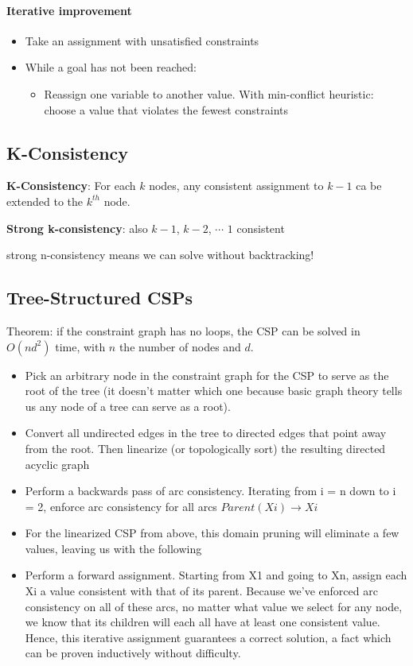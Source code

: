 \paragraph{Iterative improvement} 
\begin{itemize}
    \item Take an assignment with unsatisfied constraints
    \item While a goal has not been reached:
    \begin{itemize}
        \item Reassign one variable to another value. With  min-conflict heuristic: choose a value that violates the fewest constraints
    \end{itemize}
\end{itemize}

\subsection{K-Consistency}

\textbf{K-Consistency}: For each $k$ nodes, any consistent assignment to $k-1$ ca be extended to the $k^{th}$ node.

\textbf{Strong k-consistency}: also $k-1$, $k-2$, $\cdots$ $1$ consistent

strong n-consistency means we can solve without backtracking!

\subsection{Tree-Structured CSPs}

Theorem: if the constraint graph has no loops, the CSP can be solved in $O(n d^2)$ time, with $n$ the number of nodes and $d$.

\begin{itemize}
    \item Pick an arbitrary node in the constraint graph for the CSP to serve as the root of the tree (it doesn’t matter which one because basic graph theory tells us any node of a tree can serve as a root).
    \item Convert all undirected edges in the tree to directed edges that point away from the root. Then linearize (or topologically sort) the resulting directed acyclic graph
    \item Perform a backwards pass of arc consistency. Iterating from i = n down to i = 2, enforce arc consistency for all arcs $Parent(Xi) \rightarrow Xi$
    \item For the linearized CSP from above, this domain pruning will eliminate a few values, leaving us with the following
    \item Perform a forward assignment. Starting from X1 and going to Xn, assign each Xi a value consistent with that of its parent. Because we’ve enforced arc consistency on all of these arcs, no matter what value we select for any node, we know that its children will each all have at least one consistent value. Hence, this iterative assignment guarantees a correct solution, a fact which can be proven inductively without difficulty.
\end{itemize}

